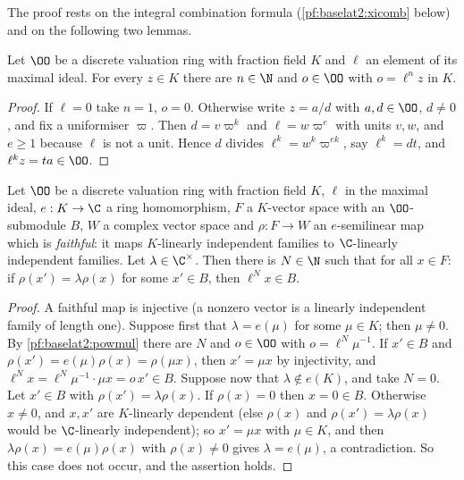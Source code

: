 The proof rests on the integral combination formula (\cref{pf:baselat2:xicomb} below) and on the following
two lemmas.

\begin{lemma}\label{pf:baselat2:powmul}
Let $\OO$ be a discrete valuation ring with fraction field $K$ and $\ell$ an element of its maximal ideal.
For every $z\in K$ there are $n\in\N$ and $o\in\OO$ with $o=\ell^nz$ in $K$.
\end{lemma}

\begin{proof}
If $\ell=0$ take $n=1$, $o=0$. Otherwise write $z=a/d$ with $a,d\in\OO$, $d\ne0$, and fix a uniformiser
$\varpi$. Then $d=v\varpi^k$ and $\ell=w\varpi^{e}$ with units $v,w$, and $e\ge1$ because $\ell$ is not a unit.
Hence $d$ divides $\ell^k=w^k\varpi^{ek}$, say $\ell^k=dt$, and $\ell^kz=ta\in\OO$.
\end{proof}

\begin{lemma}\label{pf:baselat2:faithful}
Let $\OO$ be a discrete valuation ring with fraction field $K$, $\ell$ in the maximal ideal, $e:K\to\C$ a
ring homomorphism, $F$ a $K$-vector space with an $\OO$-submodule $B$, $W$ a complex vector space and
$\rho:F\to W$ an $e$-semilinear map which is \emph{faithful}: it maps $K$-linearly independent families to
$\C$-linearly independent families. Let $\lambda\in\C^\times$. Then there is $N\in\N$ such that for all
$x\in F$: if $\rho(x')=\lambda\rho(x)$ for some $x'\in B$, then $\ell^Nx\in B$.
\end{lemma}

\begin{proof}
A faithful map is injective (a nonzero vector is a linearly independent family of length one).
Suppose first that $\lambda=e(\mu)$ for some $\mu\in K$; then $\mu\ne0$. By \cref{pf:baselat2:powmul} there are
$N$ and $o\in\OO$ with $o=\ell^N\mu^{-1}$. If $x'\in B$ and $\rho(x')=e(\mu)\rho(x)=\rho(\mu x)$, then
$x'=\mu x$ by injectivity, and $\ell^Nx=\ell^N\mu^{-1}\cdot\mu x=o\,x'\in B$.
Suppose now that $\lambda\notin e(K)$, and take $N=0$. Let $x'\in B$ with $\rho(x')=\lambda\rho(x)$. If
$\rho(x)=0$ then $x=0\in B$. Otherwise $x\neq0$, and $x,x'$ are $K$-linearly dependent (else $\rho(x)$ and
$\rho(x')=\lambda\rho(x)$ would be $\C$-linearly independent); so $x'=\mu x$ with $\mu\in K$, and then
$\lambda\rho(x)=e(\mu)\rho(x)$ with $\rho(x)\ne0$ gives $\lambda=e(\mu)$, a contradiction. So this case does
not occur, and the assertion holds.
\end{proof}

